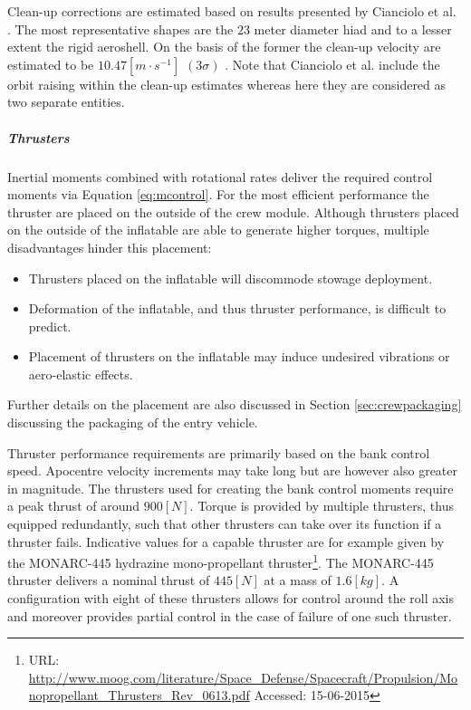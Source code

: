 Clean-up corrections are estimated based on results presented by Cianciolo et al. \cite{Cianciolo2010}. The most representative shapes are the $23$ meter diameter \gls{hiad} and to a lesser extent the rigid aeroshell. On the basis of the former the clean-up velocity are estimated to be $10.47 \left[m\cdot s^{-1}\right]$ $\left(3\sigma\right)$ \cite[p.37]{Cianciolo2010}. Note that Cianciolo et al. include the orbit raising within the clean-up estimates whereas here they are considered as two separate entities.

\subparagraph{Thrusters}
Inertial moments combined with rotational rates deliver the required control moments via Equation \ref{eq:mcontrol}. For the most efficient performance the thruster are placed on the outside of the crew module. Although thrusters placed on the outside of the inflatable are able to generate higher torques, multiple disadvantages hinder this placement:
\begin{itemize}
\item Thrusters placed on the inflatable will discommode stowage deployment.
\item Deformation of the inflatable, and thus thruster performance, is difficult to predict.
\item Placement of thrusters on the inflatable may induce undesired vibrations or aero-elastic effects.  
\end{itemize} 

Further details on the placement are also discussed in Section \ref{sec:crewpackaging} discussing the packaging of the entry vehicle.

Thruster performance requirements are primarily based on the bank control speed. Apocentre velocity increments may take long but are however also greater in magnitude. The thrusters used for creating the bank control moments require a peak thrust of around $900 \left[N\right]$. Torque is provided by multiple thrusters, thus equipped redundantly, such that other thrusters can take over its function if a thruster fails.
Indicative values for a capable thruster are for example given by the  MONARC-445 hydrazine mono-propellant thruster\footnote{URL: \url{http://www.moog.com/literature/Space\_Defense/Spacecraft/Propulsion/Monopropellant\_Thrusters\_Rev\_0613.pdf} Accessed: 15-06-2015}. The MONARC-445 thruster delivers a nominal thrust of $445 \left[N\right]$ at a mass of $1.6 \left[kg\right]$.  A configuration with eight of these thrusters allows for control around the roll axis and moreover provides partial control in the case of failure of one such thruster.
 

